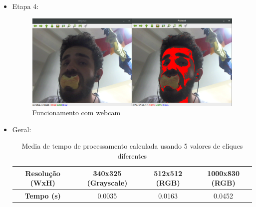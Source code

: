 \documentclass{bmvc2k}
\begin{document}
\begin{itemize}
\begin{figure}[!ht]
                \vspace{-7mm}
                \label{fig:videotest}
            \end{figure}
        \item Etapa 4:
            \vspace{-2mm}
            \begin{figure}[!ht]
                \centering
                \includegraphics[scale=.26]{Figs/webcamtest.png}
                \vspace{-3mm}
                \caption{Funcionamento com webcam}
                \vspace{-7mm}
                \label{fig:webcamtest}
            \end{figure}
        \item Geral:
            \vspace{-1mm}
            \begin{table}[!ht]
                \centering
                \begin{tabular}{|c|c|c|c|}
                    \hline
                    \textbf{Resolução (WxH)} & 340x325 (Grayscale) & 512x512 (RGB) & 1000x830 (RGB)  \\ \hline
                    \textbf{Tempo (s)}       &    0.0035     &    0.0163     &      0.0452     \\ \hline
                \end{tabular}
                \vspace{2mm}
                \caption{Media de tempo de processamento calculada usando 5 valores de cliques diferentes}
                \label{tab:eficiencia}
            \end{table}
    \end{itemize}
\newpage
\end{document}
